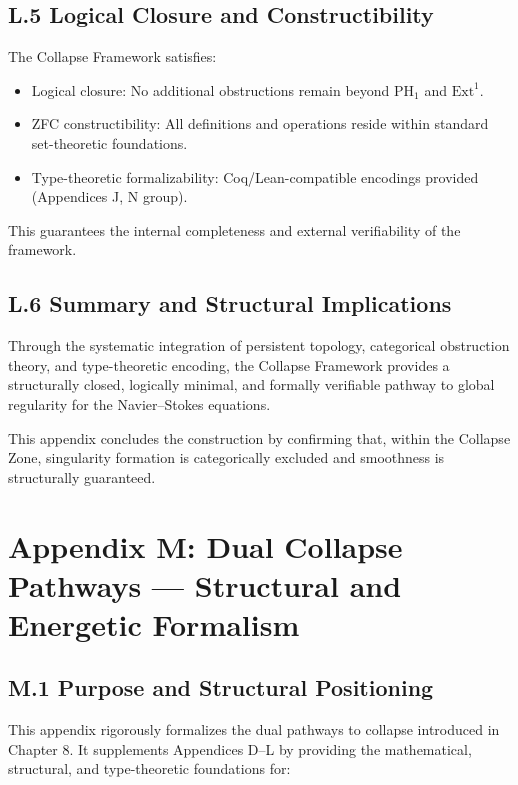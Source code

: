 \documentclass[11pt]{article}
\begin{document}
\subsection*{L.5 Logical Closure and Constructibility}

The Collapse Framework satisfies:

\begin{itemize}
  \item Logical closure: No additional obstructions remain beyond \( \mathrm{PH}_1 \) and \( \mathrm{Ext}^1 \).
  \item ZFC constructibility: All definitions and operations reside within standard set-theoretic foundations.
  \item Type-theoretic formalizability: Coq/Lean-compatible encodings provided (Appendices J, N group).
\end{itemize}

This guarantees the internal completeness and external verifiability of the framework.

\subsection*{L.6 Summary and Structural Implications}

Through the systematic integration of persistent topology, categorical obstruction theory, and type-theoretic encoding,  
the Collapse Framework provides a structurally closed, logically minimal, and formally verifiable pathway to global regularity for the Navier–Stokes equations.

This appendix concludes the construction by confirming that, within the Collapse Zone, singularity formation is categorically excluded and smoothness is structurally guaranteed.



\section*{Appendix M: Dual Collapse Pathways --- Structural and Energetic Formalism}

\subsection*{M.1 Purpose and Structural Positioning}

This appendix rigorously formalizes the dual pathways to collapse introduced in Chapter 8. It supplements Appendices D--L by providing the mathematical, structural, and type-theoretic foundations for:
\end{document}
